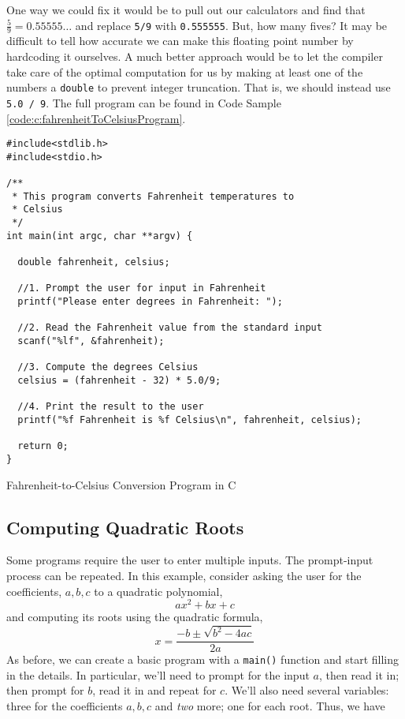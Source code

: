 One way we could fix it would be to pull out our calculators and find that
$\frac{5}{9} = 0.55555\ldots$ and replace \texttt{5/9} with \texttt{0.555555}.
But, how many fives?  It may be difficult to tell how accurate we can make
this floating point number by hardcoding it ourselves.  A much better approach
would be to let the compiler take care of the optimal computation for us by
making at least one of the numbers a \texttt{double} to prevent
integer truncation.  That is, we should instead use \texttt{5.0 / 9}.
The full program can be found in Code Sample \ref{code:c:fahrenheitToCelsiusProgram}.

\begin{listing}[H]
\begin{verbatim}
#include<stdlib.h>
#include<stdio.h>

/**
 * This program converts Fahrenheit temperatures to 
 * Celsius
 */
int main(int argc, char **argv) {

  double fahrenheit, celsius;
  
  //1. Prompt the user for input in Fahrenheit
  printf("Please enter degrees in Fahrenheit: ");
  
  //2. Read the Fahrenheit value from the standard input
  scanf("%lf", &fahrenheit);
  
  //3. Compute the degrees Celsius
  celsius = (fahrenheit - 32) * 5.0/9;
  
  //4. Print the result to the user
  printf("%f Fahrenheit is %f Celsius\n", fahrenheit, celsius);
  
  return 0;
}
\end{verbatim}
\caption{Fahrenheit-to-Celsius Conversion Program in C}
\label{code:c:fahrenheitToCelsiusProgram}
\end{listing}

\subsection{Computing Quadratic Roots}

Some programs require the user to enter multiple inputs.  The 
prompt-input process can be repeated.  In this example, consider asking
the user for the coefficients, $a, b, c$ to a quadratic polynomial, 
  $$ax^2 + bx + c$$
and computing its roots using the quadratic formula, 
  $$x = \frac{-b \pm \sqrt{b^2 - 4ac}}{2a}$$
As before, we can create a basic program with a \texttt{main()}
function and start filling in the details.  In particular, we'll need to prompt
for the input $a$, then read it in; then prompt for $b$, read it in and
repeat for $c$.  We'll also need several variables: three for the coefficients
$a, b, c$ and \emph{two} more; one for each root.  Thus, we have 

